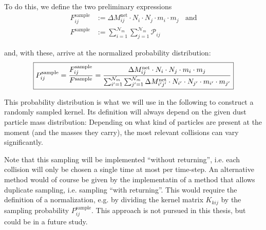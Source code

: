     To do this, we define the two preliminary expressions 
    \begin{align}
        F_{ij}^\text{sample} 
            &:= \Delta M_{ij}^\text{net} \cdot N_i \cdot N_j \cdot m_i \cdot m_j 
        \ \ \ \ \text{and} \\
        F^\text{sample} 
            &:= \sum_{i=1}^{\mathcal N_m} \sum_{j=1}^{\mathcal N_m} \mathcal P_{ij}
    \end{align}

    and, with these, arrive at the normalized probability distribution: 
    \begin{align}
        \boxed{
        P_{ij}^\text{sample} 
            = \frac{F_{ij}^\text{sample}}{F^\text{sample}} 
            = \frac{
                \Delta M_{ij}^\text{net} \cdot N_i \cdot N_j \cdot m_i \cdot m_j
            }{
                \sum_{i'=1}^{\mathcal N_m} \sum_{j'=1}^{\mathcal N_m} 
                \Delta M_{i'j'}^\text{net} \cdot N_{i'} \cdot N_{j'} 
                \cdot m_{i'} \cdot m_{j'}
            }
        }
    \end{align}

    This probability distribution is what we will use in the following to construct a randomly
    sampled kernel. Its definition will always depend on the given dust particle mass 
    distribution: Depending on 
    what kind of particles are present at the moment (and the masses they carry), the most 
    relevant collisions can vary significantly. \\ 

    \cleardoublepage

    Note that this sampling will be implemented ``without returning'', i.e. each collision 
    will only be chosen a single time at most per time-step. 
    An alternative method would of course be given by the implementatin of a method
    that allows duplicate sampling, i.e. sampling ``with returning''. This would require 
    the definition of a normalization, e.g. by dividing the kernel matrix $K_{kij}$ by 
    the sampling probability $P^\text{sample}_{ij}$.
    This approach is not pursued in this thesis, but could be in a future study. \\

